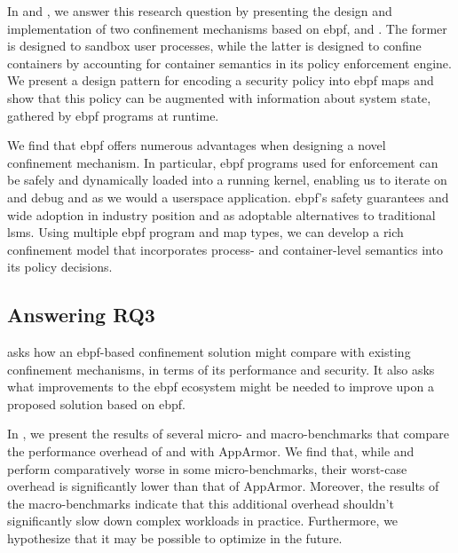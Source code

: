 In  and , we answer this research question by presenting
the design and implementation of two confinement mechanisms based on \gls{ebpf}, \bpfbox{}
and \bpfcontain{}. The former is designed to sandbox user processes, while the latter is
designed to confine containers by accounting for container semantics in its policy
enforcement engine. We present a design pattern for encoding a security policy into
\gls{ebpf} maps and show that this policy can be augmented with information about
system state, gathered by \gls{ebpf} programs at runtime.

We find that \gls{ebpf} offers numerous advantages when designing a novel confinement
mechanism. In particular, \gls{ebpf} programs used for enforcement can be safely and
dynamically loaded into a running kernel, enabling us to iterate on and debug \bpfbox{}
and \bpfcontain{} as we would a userspace application. \gls{ebpf}'s safety guarantees and
wide adoption in industry position \bpfbox{} and \bpfcontain{} as adoptable alternatives
to traditional \glspl{lsm}. Using multiple \gls{ebpf} program and map types, we can
develop a rich confinement model that incorporates process- and container-level semantics
into its policy decisions.

\subsection{Answering RQ3}%
\label{ss:disc-rq3}

 asks how an \gls{ebpf}-based confinement solution might compare with existing
confinement mechanisms, in terms of its performance and security. It also asks what
improvements to the \gls{ebpf} ecosystem might be needed to improve upon a proposed
solution based on \gls{ebpf}.

In , we present the results of several micro- and macro-benchmarks that
compare the performance overhead of \bpfbox{} and \bpfcontain{} with AppArmor.  We find
that, while \bpfbox{} and \bpfcontain{} perform comparatively worse in some
micro-benchmarks, their worst-case overhead is significantly lower than that of AppArmor.
Moreover, the results of the macro-benchmarks indicate that this additional overhead
shouldn't significantly slow down complex workloads in practice. Furthermore, we
hypothesize that it may be possible to optimize \bpfcontain{} in the future.


